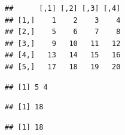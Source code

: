\documentclass[krantz2]{krantz}\usepackage{knitr}
\begin{document}
\begin{warningbox}
\begin{knitrout}\footnotesize
{}\color{fgcolor}\begin{kframe}
\begin{alltt}
 \hlkwb{<-} \hlstd{(}\hlopt{:}\hlstd{,}  \hlstd{=} \hlstd{,}  \hlstd{=} \hlstd{)}
\end{alltt}
\begin{verbatim}
##      [,1] [,2] [,3] [,4]
## [1,]    1    2    3    4
## [2,]    5    6    7    8
## [3,]    9   10   11   12
## [4,]   13   14   15   16
## [5,]   17   18   19   20
\end{verbatim}
\begin{alltt}
\end{alltt}
\begin{verbatim}
## [1] 5 4
\end{verbatim}
\begin{alltt}
\hlstd{B[}\hlstd{]}
\end{alltt}
\begin{verbatim}
## [1] 18
\end{verbatim}
\begin{alltt}
\hlstd{B[}\hlstd{,} \hlstd{]}
\end{alltt}
\begin{verbatim}
## [1] 18
\end{verbatim}
\end{kframe}
\end{knitrout}
\end{warningbox}
\end{document}
